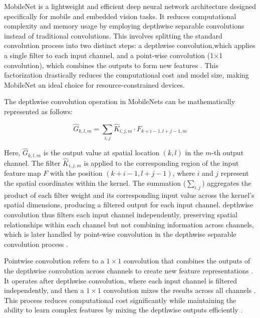 MobileNet is a lightweight and efficient deep neural network architecture designed specifically for mobile and embedded vision tasks. It reduces computational complexity and memory usage by employing depthwise separable convolutions instead of traditional convolutions. This involves splitting the standard convolution process into two distinct steps: a depthwise convolution,which applies a single filter to each input channel, and a point-wise convolution (1×1 convolution), which combines the outputs to form new features \cite{howard2017mobilenetsefficientconvolutionalneural}. This factorization drastically reduces the computational cost and model size, making MobileNet an ideal choice for resource-constrained devices.

The depthwise convolution operation in MobileNets can be mathematically represented as follows:

\begin{equation}
    \hat{G}_{k,l,m} = \sum_{i,j} \hat{K}_{i,j,m} \cdot F_{k+i-1,l+j-1,m}
\end{equation}



Here, \(\hat{G}_{k,l,m}\) is the output value at spatial location \((k, l)\) in the \(m\)-th output channel. The filter \(\hat{K}_{i,j,m}\) is applied to the corresponding region of the input feature map \(F\) with the position \((k+i-1, l+j-1)\), where \(i\) and \(j\) represent the spatial coordinates within the kernel. The summation (\(\sum_{i,j}\)) aggregates the product of each filter weight and its corresponding input value across the kernel's spatial dimensions, producing a filtered output for each input channel. depthwise convolution thus filters each input channel independently, preserving spatial relationships within each channel but not combining information across channels, which is later handled by point-wise convolution in the depthwise separable convolution process \cite{howard2017mobilenetsefficientconvolutionalneural}.

Pointwise convolution refers to a \( 1 \times 1 \) convolution that combines the outputs of the depthwise convolution across channels to create new feature representations . It operates after depthwise convolution, where each input channel is filtered independently, and then a \( 1 \times 1 \) convolution mixes the results across all channels \cite{howard2017mobilenetsefficientconvolutionalneural}. This process reduces computational cost significantly while maintaining the ability to learn complex features by mixing the depthwise outputs efficiently \cite{he2015deepresiduallearningimage}.

